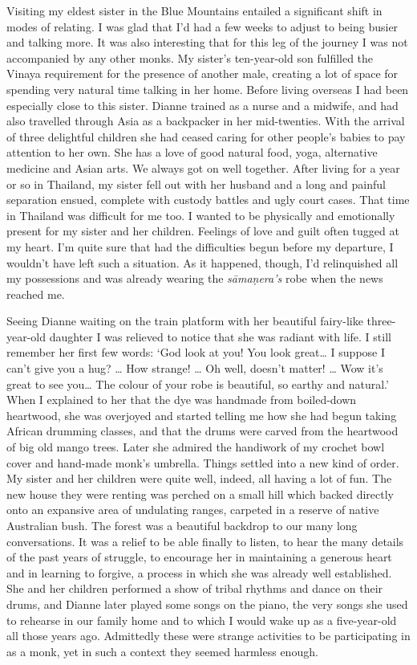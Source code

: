 Visiting my eldest sister in the Blue Mountains entailed a significant
shift in modes of relating. I was glad that I'd had a few weeks to
adjust to being busier and talking more. It was also interesting that
for this leg of the journey I was not accompanied by any other monks. My
sister's ten-year-old son fulfilled the Vinaya requirement for the
presence of another male, creating a lot of space for spending very
natural time talking in her home. Before living overseas I had been
especially close to this sister. Dianne trained as a nurse and a
midwife, and had also travelled through Asia as a backpacker in her
mid-twenties. With the arrival of three delightful children she had
ceased caring for other people's babies to pay attention to her own. She
has a love of good natural food, yoga, alternative medicine and Asian
arts. We always got on well together. After living for a year or so in
Thailand, my sister fell out with her husband and a long and painful
separation ensued, complete with custody battles and ugly court cases. 
That time in Thailand was difficult for me too. I wanted to be
physically and emotionally present for my sister and her children. 
Feelings of love and guilt often tugged at my heart. I'm quite sure that
had the difficulties begun before my departure, I wouldn't have left
such a situation. As it happened, though, I'd relinquished all my
possessions and was already wearing the \emph{sāmaṇera's} robe when the
news reached me. 

Seeing Dianne waiting on the train platform with her beautiful
fairy-like three-year-old daughter I was relieved to notice that she was
radiant with life. I still remember her first few words: `God look at
you! You look great\ldots{} I suppose I can't give you a hug? \ldots{}
How strange! \ldots{} Oh well, doesn't matter! \ldots{} Wow it's great
to see you\ldots{} The colour of your robe is beautiful, so earthy and
natural.' When I explained to her that the dye was handmade from
boiled-down heartwood, she was overjoyed and started telling me how she
had begun taking African drumming classes, and that the drums were
carved from the heartwood of big old mango trees. Later she admired the
handiwork of my crochet bowl cover and hand-made monk's umbrella. Things
settled into a new kind of order. My sister and her children were quite
well, indeed, all having a lot of fun. The new house they were renting
was perched on a small hill which backed directly onto an expansive area
of undulating ranges, carpeted in a reserve of native Australian bush. 
The forest was a beautiful backdrop to our many long conversations. It
was a relief to be able finally to listen, to hear the many details of
the past years of struggle, to encourage her in maintaining a generous
heart and in learning to forgive, a process in which she was already
well established. She and her children performed a show of tribal
rhythms and dance on their drums, and Dianne later played some songs on
the piano, the very songs she used to rehearse in our family home and to
which I would wake up as a five-year-old all those years ago. Admittedly
these were strange activities to be participating in as a monk, yet in
such a context they seemed harmless enough. 


